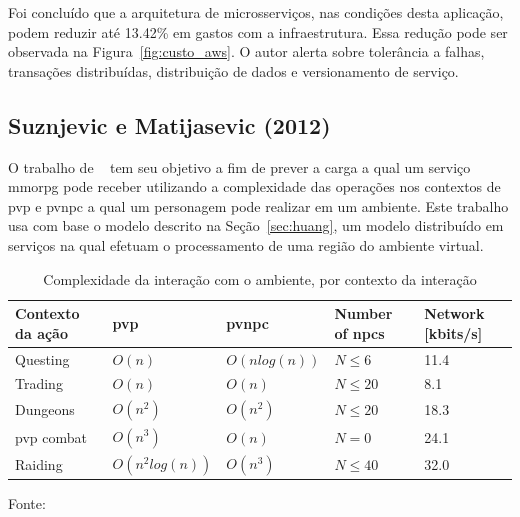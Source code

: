 Foi concluído que a arquitetura de microsserviços, nas condições desta aplicação, podem reduzir até 13.42\% em gastos com a infraestrutura.
%
Essa redução pode ser observada na Figura~\ref{fig:custo_aws}.
%
O autor alerta sobre tolerância a falhas, transações distribuídas, distribuição de dados e versionamento de serviço.


\subsection{Suznjevic e Matijasevic (2012)}



O trabalho de ~\cite{6374456} tem seu objetivo a fim de prever a carga a qual um serviço \ac{mmorpg} pode receber utilizando a complexidade das operações nos contextos de \ac{pvp} e \ac{pvnpc} a qual um personagem pode realizar em um ambiente.
%
Este trabalho usa com base o modelo descrito na Seção~\ref{sec:huang}, um modelo distribuído em serviços na qual efetuam o processamento de uma região do ambiente virtual.



\begin{table}[htb!]
\centering
\caption{Complexidade da interação com o ambiente, por contexto da interação}
\label{tab:complexidade}
\begin{tabular}{|l|l|l|l|l|}
\hline
Contexto da ação        & \ac{pvp}           & \ac{pvnpc}              & Number of \ac{npcs}    & Network {[}kbits/s{]} \\ \hline
Questing                & $O(n)$             & $O(n log(n))$           & $N \leq 6 $            & 11.4          \\ \hline
Trading                 & $O(n)$             & $O(n)$                  & $N \leq 20$            & 8.1           \\ \hline
Dungeons                & $O(n^2)$           & $O(n^2)$                & $N \leq 20$            & 18.3          \\ \hline
\ac{pvp} combat         & $O(n^3)$           & $O(n)$                  & $N = 0    $            & 24.1          \\ \hline
Raiding                 & $O(n^2 log(n))$    & $O(n^3)$                & $N \leq 40$            & 32.0          \\ \hline
\end{tabular}

Fonte:~\cite{6374456}
\end{table}



